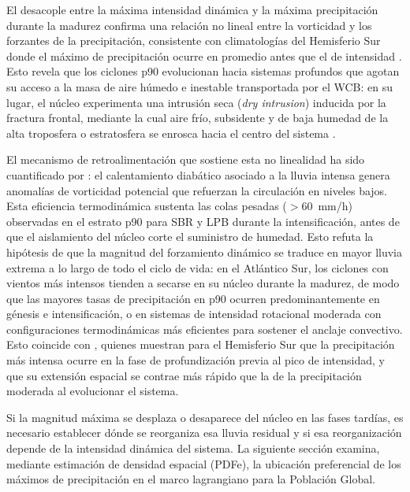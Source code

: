 El desacople entre la máxima intensidad dinámica y la máxima precipitación durante la madurez confirma una relación no lineal entre la vorticidad y los forzantes de la precipitación, consistente con climatologías del Hemisferio Sur donde el máximo de precipitación ocurre en promedio antes que el de intensidad \citep{dacre2023climatology}. Esto revela que los ciclones p90 evolucionan hacia sistemas profundos que agotan su acceso a la masa de aire húmedo e inestable transportada por el WCB: en su lugar, el núcleo experimenta una intrusión seca (\textit{dry intrusion}) inducida por la fractura frontal, mediante la cual aire frío, subsidente y de baja humedad de la alta troposfera o estratosfera se enrosca hacia el centro del sistema \citep{shapiro1999bridge}.

El mecanismo de retroalimentación que sostiene esta no linealidad ha sido cuantificado por \citet{corner2025classification}: el calentamiento diabático asociado a la lluvia intensa genera anomalías de vorticidad potencial que refuerzan la circulación en niveles bajos. Esta eficiencia termodinámica sustenta las colas pesadas ($>$60~mm/h) observadas en el estrato p90 para SBR y LPB durante la intensificación, antes de que el aislamiento del núcleo corte el suministro de humedad. Esto refuta la hipótesis de que la magnitud del forzamiento dinámico se traduce en mayor lluvia extrema a lo largo de todo el ciclo de vida: en el Atlántico Sur, los ciclones con vientos más intensos tienden a secarse en su núcleo durante la madurez, de modo que las mayores tasas de precipitación en p90 ocurren predominantemente en génesis e intensificación, o en sistemas de intensidad rotacional moderada con configuraciones termodinámicas más eficientes para sostener el anclaje convectivo. Esto coincide con \citet{mcerlich2023extremes}, quienes muestran para el Hemisferio Sur que la precipitación más intensa ocurre en la fase de profundización previa al pico de intensidad, y que su extensión espacial se contrae más rápido que la de la precipitación moderada al evolucionar el sistema.

Si la magnitud máxima se desplaza o desaparece del núcleo en las fases tardías, es necesario establecer dónde se reorganiza esa lluvia residual y si esa reorganización depende de la intensidad dinámica del sistema. La siguiente sección examina, mediante estimación de densidad espacial (PDFe), la ubicación preferencial de los máximos de precipitación en el marco lagrangiano para la Población Global.

